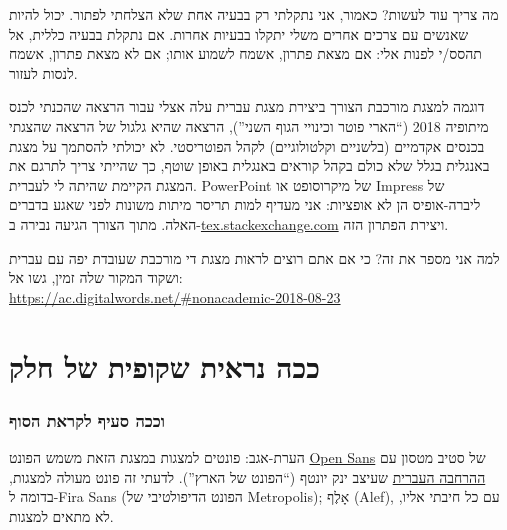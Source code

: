 \documentclass{beamer}
\newcommand*\smallurl[1]{{\scriptsize\url{#1}}}
\begin{document}
	
	\begin{frame}{מה צריך עוד לעשות?}
		כאמור, אני נתקלתי רק בבעיה אחת שלא הצלחתי לפתור. יכול להיות שאנשים עם צרכים אחרים משלי יתקלו בבעיות אחרות. אם נתקלת בבעיה כללית, אל תהסס/י לפנות אלי: אם מצאת פתרון, אשמח לשמוע אותו; אם לא מצאת פתרון, אשמח לנסות לעזור.
	\end{frame}
	
	
	\begin{frame}{דוגמה למצגת מורכבת}
		הצורך ביצירת מצגת עברית עלה אצלי עבור הרצאה שהכנתי לכנס מיתופיה 2018 (``הארי פוטר וכינויי הגוף השני''), הרצאה שהיא גלגול של הרצאה שהצגתי בכנסים אקדמיים (בלשניים וקלטולוגיים) לקהל הפוטריסטי. לא יכולתי להסתמך על מצגת באנגלית בגלל שלא כולם בקהל קוראים באנגלית באופן שוטף, כך שהייתי צריך לתרגם את המצגת הקיימת שהיתה לי לעברית. PowerPoint של מיקרוסופט או Impress של ליברה-אופיס הן לא אופציות: אני מעדיף למות תריסר מיתות משונות לפני שאגע בדברים האלה. מתוך הצורך הגיעה נבירה ב-\url{tex.stackexchange.com} ויצירת הפתרון הזה.
		
		למה אני מספר את זה? כי אם אתם רוצים לראות מצגת די מורכבת שעובדת יפה עם עברית ושקוד המקור שלה זמין, גשו אל:\\
		\smallurl{https://ac.digitalwords.net/\#nonacademic-2018-08-23}
	\end{frame}
	
	
	
	\part{ככה נראית שקופית של חלק}
	\frame{\partpage}
	
	\section{וככה סעיף לקראת הסוף}
	
	\begin{frame}{הערת-אגב: פונטים למצגות}
		במצגת הזאת משמש הפונט \href{https://en.wikipedia.org/wiki/Open_Sans}{Open Sans} של סטיב מטסון עם \href{https://yaronimus.wordpress.com/2014/01/19/\%D7\%90\%D7\%95\%D7\%A4\%D7\%9F-\%D7\%A1\%D7\%90\%D7\%A0\%D7\%A1-\%D7\%92\%D7\%95\%D7\%A4\%D7\%9F-\%D7\%A8\%D7\%A9\%D7\%AA-\%D7\%97\%D7\%99\%D7\%A0\%D7\%9E\%D7\%99-\%D7\%91\%D7\%A2\%D7\%99\%D7\%A6\%D7\%95\%D7\%91\%D7\%95-\%D7\%A9\%D7\%9C-\%D7\%99\%D7\%90/}{ההרחבה העברית} שעיצב ינק יונטף (``הפונט של הארץ'').
		לדעתי זה פונט מעולה למצגות, בדומה ל-Fira Sans (הפונט הדיפולטיבי של Metropolis); $\mbox{אָלֶף}$ (Alef), עם כל חיבתי אליו, לא מתאים למצגות.
	\end{frame}
\end{document}
